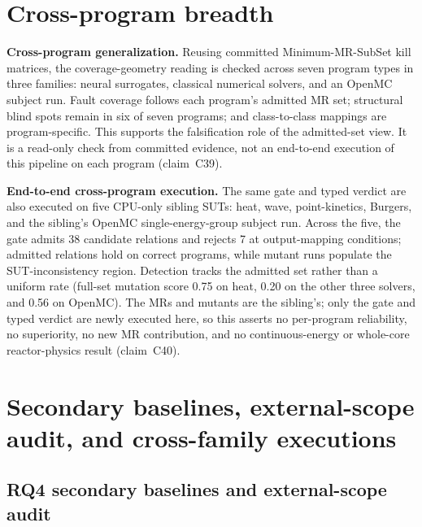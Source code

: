 \section{Cross-program breadth}
\label{app:cross-program}

\textbf{Cross-program generalization.} Reusing committed Minimum-MR-SubSet kill matrices, the coverage-geometry reading is checked across seven program types in three families: neural surrogates, classical numerical solvers, and an OpenMC subject run. Fault coverage follows each program's admitted MR set; structural blind spots remain in six of seven programs; and class-to-class mappings are program-specific. This supports the falsification role of the admitted-set view. It is a read-only check from committed evidence, not an end-to-end execution of this pipeline on each program (claim~C39).

\textbf{End-to-end cross-program execution.} The same gate and typed verdict are also executed on five CPU-only sibling SUTs: heat, wave, point-kinetics, Burgers, and the sibling's OpenMC single-energy-group subject run. Across the five, the gate admits 38 candidate relations and rejects 7 at output-mapping conditions; admitted relations hold on correct programs, while mutant runs populate the SUT-inconsistency region. Detection tracks the admitted set rather than a uniform rate (full-set mutation score 0.75 on heat, 0.20 on the other three solvers, and 0.56 on OpenMC). The MRs and mutants are the sibling's; only the gate and typed verdict are newly executed here, so this asserts no per-program reliability, no superiority, no new MR contribution, and no continuous-energy or whole-core reactor-physics result (claim~C40).

\section{Secondary baselines, external-scope audit, and cross-family executions}
\label{app:secondary}

\subsection{RQ4 secondary baselines and external-scope audit}
\label{subsec:llm-mr-baseline}

